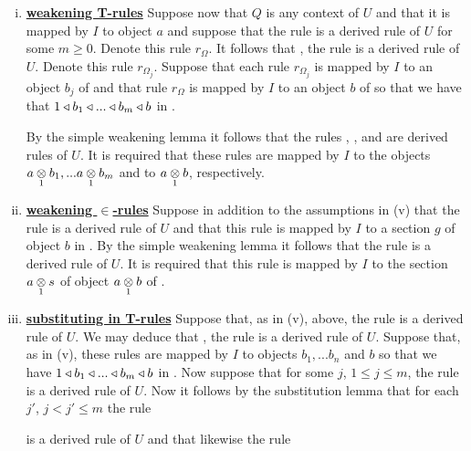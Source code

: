 \begin{definition}
\begin{enumerate}[(i)]
\item \underline{\textbf{weakening T-rules}} 
Suppose now that $Q$ is any context of $U$ and that it is mapped by $I$ to object $a$ and suppose that the rule 
 is a derived rule of $U$ for some $m \geq 0$. Denote this rule $r_\Omega$. 
It follows that \foreachj, the rule    is a derived rule of $U$. Denote this rule $r_{\Omega_j}$.
Suppose that each rule $r_{\Omega_j}$ is mapped by $I$ to an object $b_j$ of \catcw and that rule $r_\Omega$ is mapped by $I$ to an object $b$ of \catcw so that
we have that $1 \base b_1 \base ... \base b_m \base b$ in \catc.

By the simple weakening lemma it follows that the rules
 \kern-6pt, \foreachj, and 
 are  derived rules of $U$. It is required that these rules are mapped by $I$ to the objects
$\crossx{a}{b_1}{1},...\crossx{a}{b_m}{1}$ and to $\crossx{a}{b}{1}$, respectively. 

\item \underline{\textbf{weakening $\boldsymbol {\in}$-rules}} 
Suppose in addition to the assumptions in (v) that the rule  is a derived rule of $U$ 
and that this rule is mapped by $I$ to a section $g$ of object $b$ in \catc.
By the simple weakening lemma it follows that the rule 
is a derived rule of $U$. It is required that this rule is mapped by $I$ to the section $\crossx{a}{s}{1}$
of object $\crossx{a}{b}{1}$ of \catc.


\item \underline{\textbf{substituting in T-rules}} 
Suppose that, as in (v), above, the rule 
 is a derived rule of $U$.
We may deduce that \foreachj, the rule    is a derived rule of $U$. 
Suppose that, as in (v), these rules are mapped by $I$ to objects $b_1,...b_n$ and $b$ so that
we have  $1 \base b_1 \base ... \base b_m \base b$ in \catc. Now suppose that for some $j$, $1 \leq j \leq m$, the rule
 is a derived rule of $U$. 
Now it follows by the substitution lemma that for each $j'$, $j < j' \leq m$ the rule

 is a derived rule of $U$ and that likewise the rule


\end{enumerate}
\end{definition}
